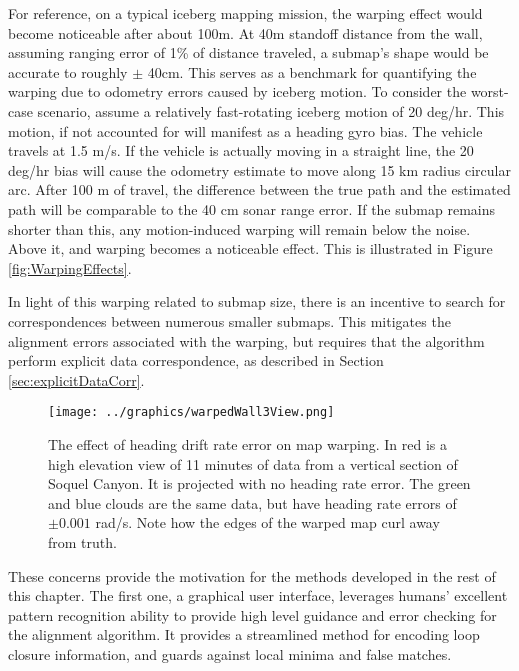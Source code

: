 For reference, on a typical iceberg mapping mission, the warping effect would become noticeable after about 100m. At 40m standoff distance from the wall, assuming ranging error of 1\% of distance traveled, a submap's shape would be accurate to roughly $\pm$ 40cm. This serves as a benchmark for quantifying the warping due to odometry errors caused by iceberg motion. To consider the worst-case scenario, assume a relatively fast-rotating iceberg motion of 20 deg/hr. This motion, if not accounted for will manifest as a heading gyro bias. The vehicle travels at 1.5 m/s. If the vehicle is actually moving in a straight line, the 20 deg/hr bias will cause the odometry estimate to move along 15 km radius circular arc. After 100 m of travel, the difference between the true path and the estimated path will be comparable to the 40 cm sonar range error. If the submap remains shorter than this, any motion-induced warping will remain below the noise. Above it, and warping becomes a noticeable effect. This is illustrated in Figure \ref{fig:WarpingEffects}.

In light of this warping related to submap size, there is an incentive to search for correspondences between numerous smaller submaps. This mitigates the alignment errors associated with the warping, but requires that the algorithm perform explicit data correspondence, as described in Section \ref{sec:explicitDataCorr}.

 \begin{figure}[htb]
   \centering
   \texttt{[image: ../graphics/warpedWall3View.png]} %
   \caption{The effect of heading drift rate error on map warping. In red is a high elevation view of 11 minutes of data from a vertical section of Soquel Canyon. It is projected with no heading rate error. The green and blue clouds are the same data, but have heading rate errors of $\pm0.001$ rad/s. Note how the edges of the warped map curl away from truth.}
   \label{fig:motionErrorWarping}
\end{figure}


These concerns provide the motivation for the methods developed in the rest of this chapter. The first one, a graphical user interface, leverages humans' excellent pattern recognition ability to provide high level guidance and error checking for the alignment algorithm. It provides a streamlined method for encoding loop closure information, and guards against local minima and false matches. 

